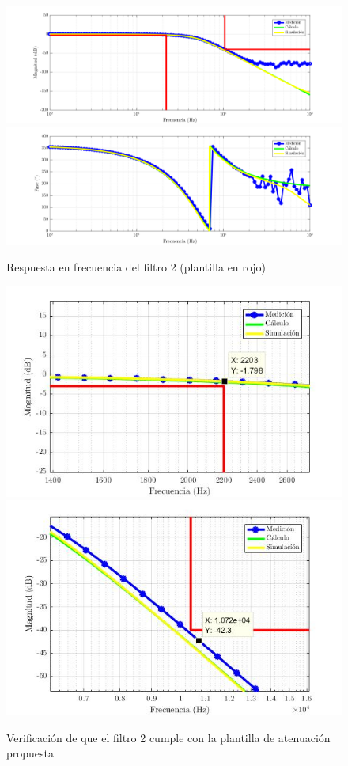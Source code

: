 \documentclass[../../tc_tp5_main.tex]{subfiles}
\begin{document}
\begin{figure}[H]
	\centering
	\includegraphics[scale=0.7]{imagenes/tc_tp5_ej1_bes_mag.png}
	\includegraphics[scale=0.7]{imagenes/tc_tp5_ej1_bes_fase.png}
	\caption{Respuesta en frecuencia del filtro 2 (plantilla en rojo)}
\end{figure}


\begin{figure}[H]
	\centering
	\includegraphics[scale=0.42]{imagenes/bes_bandapasante.jpg}
	\includegraphics[scale=0.4]{imagenes/bes_bandaatenuada.jpg}
	\caption{Verificaci\'on de que el filtro 2 cumple con la plantilla de atenuaci\'on propuesta}
\end{figure}
\end{document}
